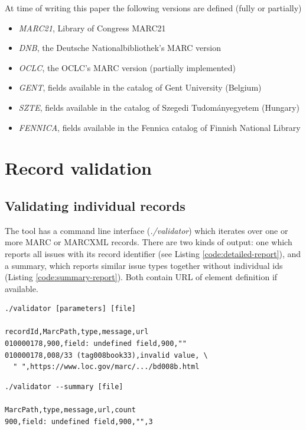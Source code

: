 At time of writing this paper the following versions are defined (fully or partially)

\begin{itemize}
 \setlength{\parskip}{0pt}
 \setlength{\itemsep}{0pt plus 1pt}
  \item \emph{MARC21}, Library of Congress MARC21
  \item \emph{DNB}, the Deutsche Nationalbibliothek's MARC version
  \item \emph{OCLC}, the OCLC's MARC version (partially implemented)
  \item \emph{GENT}, fields available in the catalog of Gent University (Belgium)
  \item \emph{SZTE}, fields available in the catalog of Szegedi Tudományegyetem (Hungary)
  \item \emph{FENNICA}, fields available in the Fennica catalog of Finnish National Library
\end{itemize}


\section{Record validation}

\subsection{Validating individual records}

The tool has a command line interface (\emph{./validator}) which iterates over one or more MARC or MARCXML records. There are two kinds of output: one which reports all issues with its record identifier (see Listing \ref{code:detailed-report}), and a summary, which reports similar issue types together without individual ids (Listing \ref{code:summary-report}). Both contain URL of element definition if available.

\begin{lstlisting}[float, caption=Detailed report, label=code:detailed-report]
./validator [parameters] [file]

recordId,MarcPath,type,message,url
010000178,900,field: undefined field,900,""
010000178,008/33 (tag008book33),invalid value, \
  " ",https://www.loc.gov/marc/.../bd008b.html
\end{lstlisting}

\begin{lstlisting}[float, caption=Summarized report, label=code:summary-report]
./validator --summary [file]

MarcPath,type,message,url,count
900,field: undefined field,900,"",3
\end{lstlisting}

